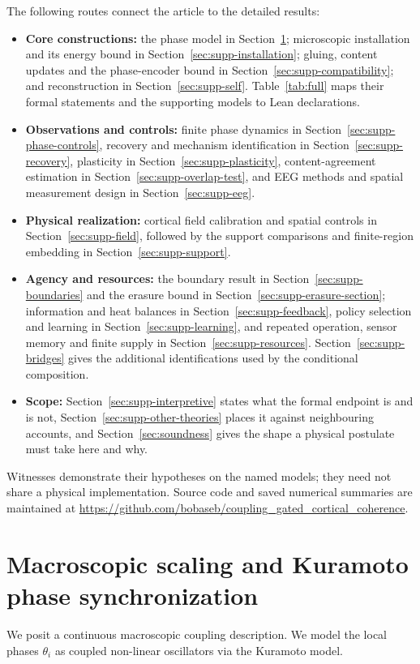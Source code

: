 \documentclass{article}
\begin{document}
The following routes connect the article to the detailed results:
\begin{itemize}
\item \textbf{Core constructions:} the phase model in Section~\ref{sec:supp-phase}; microscopic installation and its energy bound in Section~\ref{sec:supp-installation}; gluing, content updates and the phase-encoder bound in Section~\ref{sec:supp-compatibility}; and reconstruction in Section~\ref{sec:supp-self}. Table~\ref{tab:full} maps their formal statements and the supporting models to Lean declarations.
\item \textbf{Observations and controls:} finite phase dynamics in Section~\ref{sec:supp-phase-controls}, recovery and mechanism identification in Section~\ref{sec:supp-recovery}, plasticity in Section~\ref{sec:supp-plasticity}, content-agreement estimation in Section~\ref{sec:supp-overlap-test}, and EEG methods and spatial measurement design in Section~\ref{sec:supp-eeg}.
\item \textbf{Physical realization:} cortical field calibration and spatial controls in Section~\ref{sec:supp-field}, followed by the support comparisons and finite-region embedding in Section~\ref{sec:supp-support}.
\item \textbf{Agency and resources:} the boundary result in Section~\ref{sec:supp-boundaries} and the erasure bound in Section~\ref{sec:supp-erasure-section}; information and heat balances in Section~\ref{sec:supp-feedback}, policy selection and learning in Section~\ref{sec:supp-learning}, and repeated operation, sensor memory and finite supply in Section~\ref{sec:supp-resources}. Section~\ref{sec:supp-bridges} gives the additional identifications used by the conditional composition.
\item \textbf{Scope:} Section~\ref{sec:supp-interpretive} states what the formal endpoint is and is not, Section~\ref{sec:supp-other-theories} places it against neighbouring accounts, and Section~\ref{sec:soundness} gives the shape a physical postulate must take here and why.
\end{itemize}
Witnesses demonstrate their hypotheses on the named models; they need not share a physical implementation. Source code and saved numerical summaries are maintained at \url{https://github.com/bobaseb/coupling_gated_cortical_coherence}.

\section{Macroscopic scaling and Kuramoto phase synchronization}
\label{sec:supp-phase}
We posit a continuous macroscopic coupling description. We model the local phases $\theta_i$ as coupled non-linear oscillators via the Kuramoto model.
\end{document}

